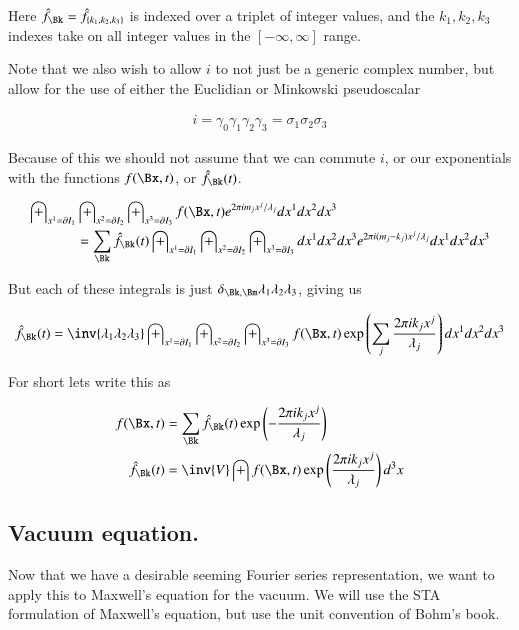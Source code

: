 \documentclass{article}
\begin{document}
Here $\hat{f}_{\Bk} = \hat{f}_{\{k_1, k_2, k_3\}}$ is indexed over a triplet of integer values, and the $k_1, k_2, k_3$ indexes take on all integer values in the $[-\infty, \infty]$ range.

Note that we also wish to allow $i$ to not just be a generic complex number, but allow for the use of either the Euclidian or Minkowski pseudoscalar

\begin{align*}
i = \gamma_0 \gamma_1 \gamma_2 \gamma_3 = \sigma_1 \sigma_2 \sigma_3
\end{align*}

Because of this we should not assume that we can commute $i$, or our exponentials with the functions $f(\Bx,t)$, or $\hat{f}_{\Bk}(t)$.

\begin{align*}
\int_{x^1 = \partial I_1} &\int_{x^2 = \partial I_2} \int_{x^3 = \partial I_3} f(\Bx, t) 
e^{ 2 \pi i m_j x^j/\lambda_j}
dx^1 dx^2 dx^3 \\
&= \sum_{\Bk} \hat{f}_{\Bk}(t) \int_{x^1 = \partial I_1} \int_{x^2 = \partial I_2} \int_{x^3 = \partial I_3} dx^1 dx^2 dx^3 e^{ 2 \pi i (m_j - k_j) x^j/\lambda_j} dx^1 dx^2 dx^3
\end{align*}

But each of these integrals is just $\delta_{\Bk,\Bm} \lambda_1 \lambda_2 \lambda_3$, giving us

\begin{align*}
\hat{f}_{\Bk}(t)
&= \inv{\lambda_1 \lambda_2 \lambda_3 } \int_{x^1 = \partial I_1} \int_{x^2 = \partial I_2} \int_{x^3 = \partial I_3} f(\Bx, t) \exp\left( \sum_j \frac{2 \pi i k_j x^j}{\lambda_j} \right) dx^1 dx^2 dx^3 \\
\end{align*}

For short lets write this as

\begin{align}
f(\Bx, t) &= \sum_{\Bk} \hat{f}_{\Bk}(t) \exp\left( - \frac{2 \pi i k_j x^j }{\lambda_j} \right) \\
\hat{f}_{\Bk}( t) &= \inv{V} \int f(\Bx, t) \exp\left( \frac{2 \pi i k_j x^j}{\lambda_j} \right) d^3 x
\end{align}

\subsection{ Vacuum equation. }

Now that we have a desirable seeming Fourier series representation, we 
want to apply this to Maxwell's equation for the vacuum.  We will use the 
STA formulation of Maxwell's equation, but use the unit convention of Bohm's
book.
\end{document}
